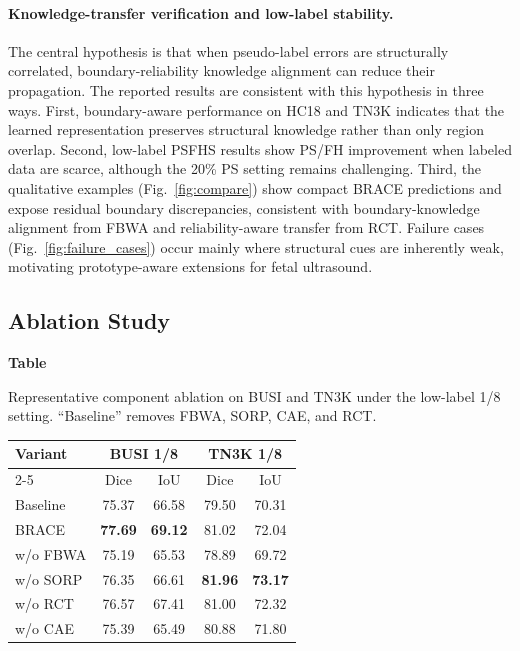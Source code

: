 \documentclass[a4paper,fleqn]{cas-dc}
\begin{document}
\paragraph{Knowledge-transfer verification and low-label stability.} The central hypothesis is that when pseudo-label errors are structurally correlated, boundary-reliability knowledge alignment can reduce their propagation. The reported results are consistent with this hypothesis in three ways. First, boundary-aware performance on HC18 and TN3K indicates that the learned representation preserves structural knowledge rather than only region overlap. Second, low-label PSFHS results show PS/FH improvement when labeled data are scarce, although the 20\% PS setting remains challenging. Third, the qualitative examples (Fig.~\ref{fig:compare}) show compact BRACE predictions and expose residual boundary discrepancies, consistent with boundary-knowledge alignment from FBWA and reliability-aware transfer from RCT. Failure cases (Fig.~\ref{fig:failure_cases}) occur mainly where structural cues are inherently weak, motivating prototype-aware extensions for fetal ultrasound.


\subsection{Ablation Study}

\par\smallskip
{}\label{tab:ablation_full}
\noindent\textbf{Table~\thetable}\\[0.1em]
\noindent\parbox{\linewidth}{\footnotesize Representative component ablation on BUSI and TN3K under the low-label 1/8 setting. ``Baseline'' removes FBWA, SORP, CAE, and RCT.}
\par\smallskip
\begin{center}
{\scriptsize
\setlength{\tabcolsep}{3pt}
\begin{tabular}{l|cc|cc}
\toprule
\multirow{2}{*}{\textbf{Variant}} & \multicolumn{2}{c|}{\textbf{BUSI 1/8}} & \multicolumn{2}{c}{\textbf{TN3K 1/8}} \\
\cline{2-5}
& Dice & IoU & Dice & IoU \\
\midrule
Baseline & 75.37 & 66.58 & 79.50 & 70.31 \\
BRACE & \textbf{77.69} & \textbf{69.12} & 81.02 & 72.04 \\
w/o FBWA & 75.19 & 65.53 & 78.89 & 69.72 \\
w/o SORP & 76.35 & 66.61 & \textbf{81.96} & \textbf{73.17} \\
w/o RCT & 76.57 & 67.41 & 81.00 & 72.32 \\
w/o CAE & 75.39 & 65.49 & 80.88 & 71.80 \\
\bottomrule
\end{tabular}
}
\end{center}
\par\smallskip
\end{document}
